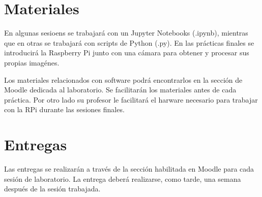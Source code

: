 \section{Materiales}
En algunas sesioens se trabajará con un Jupyter Notebooks (.ipynb), mientras que en otras se trabajará con scripts de Python (.py). En las prácticas finales se introducirá la Raspberry Pi junto con una cámara para obtener y procesar sus propias imagénes.

Los materiales relacionados con software podrá encontrarlos en la sección de Moodle dedicada al laboratorio. Se facilitarán los materiales antes de cada práctica. Por otro lado su profesor le facilitará el harware necesario para trabajar con la RPi durante las sesiones finales.

\section{Entregas}
Las entregas se realizarán a través de la sección habilitada en Moodle para cada sesión de laboratorio. La entrega deberá realizarse, como tarde, una semana después de la sesión trabajada.